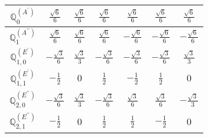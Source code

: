 \documentclass[fleqn,10pt,landscape]{article}
\begin{document}
\begin{itemize}
{\begin{center}
\begin{longtable}{ccccccc}
$\mathbb{Q}_{0}^{(A^{\prime})}$ & $ \frac{\sqrt{6}}{6} $ & $ \frac{\sqrt{6}}{6} $ & $ \frac{\sqrt{6}}{6} $ & $ \frac{\sqrt{6}}{6} $ & $ \frac{\sqrt{6}}{6} $ & $ \frac{\sqrt{6}}{6} $ \\ \hline
$\mathbb{Q}_{1}^{(A^{\prime\prime})}$ & $ \frac{\sqrt{6}}{6} $ & $ \frac{\sqrt{6}}{6} $ & $ \frac{\sqrt{6}}{6} $ & $ - \frac{\sqrt{6}}{6} $ & $ - \frac{\sqrt{6}}{6} $ & $ - \frac{\sqrt{6}}{6} $ \\ \hline
$\mathbb{Q}_{1,0}^{(E^{\prime})}$ & $ - \frac{\sqrt{3}}{6} $ & $ \frac{\sqrt{3}}{3} $ & $ - \frac{\sqrt{3}}{6} $ & $ - \frac{\sqrt{3}}{6} $ & $ - \frac{\sqrt{3}}{6} $ & $ \frac{\sqrt{3}}{3} $ \\ \hline
$\mathbb{Q}_{1,1}^{(E^{\prime})}$ & $ - \frac{1}{2} $ & $ 0 $ & $ \frac{1}{2} $ & $ - \frac{1}{2} $ & $ \frac{1}{2} $ & $ 0 $ \\ \hline
$\mathbb{Q}_{2,0}^{(E^{\prime\prime})}$ & $ - \frac{\sqrt{3}}{6} $ & $ \frac{\sqrt{3}}{3} $ & $ - \frac{\sqrt{3}}{6} $ & $ \frac{\sqrt{3}}{6} $ & $ \frac{\sqrt{3}}{6} $ & $ - \frac{\sqrt{3}}{3} $ \\ \hline
$\mathbb{Q}_{2,1}^{(E^{\prime\prime})}$ & $ - \frac{1}{2} $ & $ 0 $ & $ \frac{1}{2} $ & $ \frac{1}{2} $ & $ - \frac{1}{2} $ & $ 0 $ \\
\end{longtable}
\end{center}
}
\end{itemize}
\end{document}
